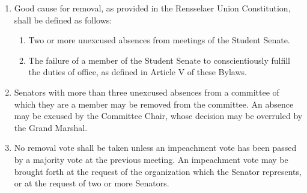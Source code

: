 
\begin{enumerate}

\item Good cause for removal, as provided in the Rensselaer Union Constitution, shall be defined as follows:
\begin{enumerate}
\item Two or more unexcused absences from meetings of the Student Senate.
\item The failure of a member of the Student Senate to conscientiously fulfill the duties of office, as defined in Article V of these
Bylaws.
\end{enumerate}

\item Senators with more than three unexcused absences from a committee of which they are a member may be removed from the
committee. An absence may be excused by the Committee Chair, whose decision may be overruled by the Grand Marshal. 

\item No removal vote shall be taken unless an impeachment vote has been passed by a majority vote at the previous meeting. An
impeachment vote may be brought forth at the request of the organization which the Senator represents, or at the request of two
or more Senators.

\end{enumerate}